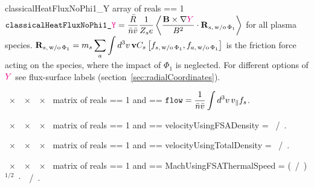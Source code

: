 \myhrule

{classicalHeatFluxNoPhi1_Y}
{ array of reals}
{ == 1}
{\newline
$\displaystyle \text{\ttfamily classicalHeatFluxNoPhi1\_\textcolor{magenta}{Y}} = \frac{\bar{R}}{\bar{n} \bar{v}} \frac{1}{Z_s e} \left\langle \frac{{\mathbf B} \times \nabla \textcolor{magenta}{Y}}{B^2} \cdot {\mathbf R}_{s,\,\mathrm{w/o}\,\Phi_1} \right\rangle$ for all plasma species. $\displaystyle {\mathbf R}_{s,\,\mathrm{w/o}\,\Phi_1} = m_s \sum_a \int d^3v \, {\mathbf v} C_s \left[f_{s,\,\mathrm{w/o}\,\Phi_1}, f_{a,\,\mathrm{w/o}\,\Phi_1}\right]$ is the friction force acting on the species, where the impact of $\Phi_1$ is neglected.\newline
For different options of $\textcolor{magenta}{Y}$ see flux-surface labels (section~\ref{sec:radialCoordinates}).}

\myhrule

{~$\times$~~$\times$~~$\times$~ matrix of reals}
{ == 1 and  == \true}
{$\displaystyle \text{\ttfamily flow} =  \frac{1}{\bar{n} \bar{v}} \int d^3v \, v_{\|} f_s$.}

\myhrule

{~$\times$~~$\times$~~$\times$~ matrix of reals}
{ == 1 and  == \true}
{{\ttfamily velocityUsingFSADensity} =  ~/~.}

\myhrule

{~$\times$~~$\times$~~$\times$~ matrix of reals}
{ == 1 and  == \true}
{{\ttfamily velocityUsingTotalDensity} =  ~/~.}

\myhrule

{~$\times$~~$\times$~~$\times$~ matrix of reals}
{ == 1 and  == \true}
{{\ttfamily MachUsingFSAThermalSpeed} =  (~/~)${}^{1/2}$~$\cdot$~~/~.}

